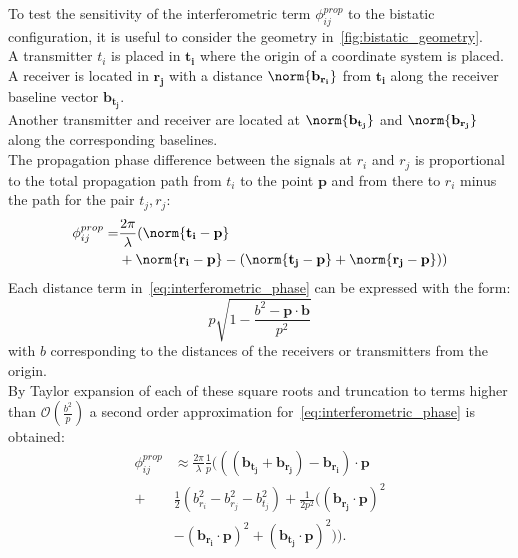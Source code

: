 To test the sensitivity of the interferometric term $\phi_{ij}^{prop}$ to the bistatic configuration, it is useful to consider the geometry in~\autoref{fig:bistatic_geometry}.\\
A transmitter $t_i$ is placed in $\mathbf{t_i}$ where the origin of a coordinate system is placed. A receiver is located in $\mathbf{r_j}$ with a distance $\norm{\mathbf{b_{r_{i}}}}$ from $\mathbf{t_{i}}$ along the receiver baseline vector $\mathbf{b_{t_{j}}}$.\\
Another transmitter and receiver are located at $\norm{\mathbf{b_{t_{j}}}}$ and $\norm{\mathbf{b_{r_{j}}}}$ along the corresponding baselines.\\
The propagation phase difference between the signals at $r_i$ and $r_j$ is proportional to the total propagation path from $t_i$  to the point $\mathbf{p}$ and from there to $r_i$ minus the path for the pair $t_j,r_j$:
\begin{equation}\label{eq:interferometric_phase}
	\begin{aligned}
		\phi_{ij}^{prop} = &\frac{2 \pi}{\lambda} (\norm{\mathbf{t_i} -\mathbf{p}}  \\
		&+  \norm{\mathbf{r_i} -\mathbf{p}} - (\norm{\mathbf{t_j} -\mathbf{p}}  +  \norm{\mathbf{r_j} -\mathbf{p}}))
	\end{aligned}
\end{equation}
Each distance term in~\autoref{eq:interferometric_phase} can be expressed with the form:
\begin{equation}
	p \sqrt{1 - \frac{b^2 - \mathbf{p} \cdot \mathbf{b}}{p^2}}
\end{equation}
with $b$ corresponding to the distances of the receivers or transmitters from the origin.\\
By Taylor expansion of each of these square roots and truncation to terms higher than $\mathcal{O}(\frac{b^2}{p})$ a second order approximation for~\autoref{eq:interferometric_phase} is obtained:
\begin{equation}\label{eq:second_order_expansion}
	\begin{aligned}
		\phi_{ij}^{prop} &\approx \frac{2\pi}{\lambda}\frac{1}{p}(((\mathbf{b_{t_j}} + \mathbf{b_{r_j}}) - \mathbf{b_{r_i}}) \cdot \mathbf{p}\\ + &\frac{1}{2}(b_{r_i}^2 - b_{r_j}^2 - b_{t_j}^2) + \frac{1}{2p^2}((\mathbf{b_{r_j}} \cdot \mathbf{p})^2\\
		&- (\mathbf{b_{r_i}} \cdot \mathbf{p})^2 + (\mathbf{b_{t_j}} \cdot \mathbf{p})^2 )).
	\end{aligned}
\end{equation}
